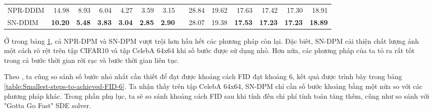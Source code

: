 \documentclass[14pt, a4paper]{article}
\numberwithin{equation}{section}
\numberwithin{figure}{section}
\numberwithin{dl}{section}
\numberwithin{md}{section}
\numberwithin{bd}{section}
\numberwithin{dn}{section}
\numberwithin{hq}{section}
\begin{document}
\begin{table}[h!]
{\begin{tabular}{ lrrrrrrrrrrrrr  }
                NPR-DDIM & 14.98 & 8.93 & 6.04 & 4.27 & 3.59 & 3.15 & & 28.84 & 19.62 & 17.63 & 17.42 & 17.30 & 18.91 \\
                SN-DDIM & \textbf{10.20} & \textbf{5.48} & \textbf{3.83} & \textbf{3.04} & \textbf{2.85} & \textbf{2.90} & & 28.07 & 19.38 & \textbf{17.53} & \textbf{17.23} & \textbf{17.23} & \textbf{18.89} \\
                \hline
            \end{tabular}
        }
        \begin{center}
        \end{center}
        \label{table:FID-CIFAR10}
    \end{table}

    Ở trong bảng \ref{table:FID-CIFAR10}, cả NPR-DPM và SN-DPM vượt trội hơn hầu hết các phương pháp còn lại.
    Đặc biêt, SN-DPM cải thiện chất lượng ảnh một cách rõ rệt trên tập CIFAR10 và tập CelebA 64x64 khi số bước được sử dụng nhỏ.
    Hơn nữa, các phương pháp của ta tỏ ra rất tốt trong cả bước thời gian rời rạc và bước thời gian liên tục.

    Theo \cite{bao2021analytic}, ta cũng so sánh số bước nhỏ nhất cần thiết để đạt được khoảng cách FID đạt khoảng 6,
    kết quả được trình bày trong bảng \ref{table:Smallest-steps-to-achieved-FID-6}.
    Ta nhận thấy trên tập CelebA 64x64, SN-DPM chỉ cần số bước khoảng bằng một nửa so với các phương pháp khác.
    Trong phần phụ lục, ta sẽ so sánh khoảng cách FID sau khi tính đến chi phí tính toán tăng thêm,
    cũng như so sánh với "Gotta Go Fast" SDE solver.
\end{document}
